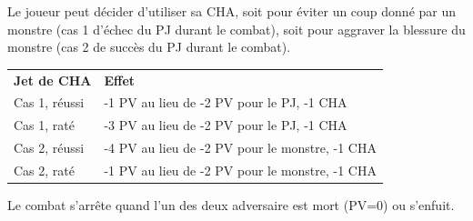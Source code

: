 \begin{frame}[b]
{\myindent Le joueur peut décider d'utiliser sa CHA, soit pour éviter un coup donné par un monstre (cas 1 d'échec du PJ durant le combat), soit pour aggraver la blessure du monstre (cas 2 de succès du PJ durant le combat).

\begin{center}
\begin{tabular}{ll}
\textbf{Jet de CHA} & \textbf{Effet}                                        \\
    Cas 1, réussi          & -1 PV au lieu de -2 PV pour le PJ, -1 CHA      \\
    Cas 1, raté            & -3 PV au lieu de -2 PV pour le PJ, -1 CHA      \\
    Cas 2, réussi          & -4 PV au lieu de -2 PV pour le monstre, -1 CHA \\
    Cas 2, raté            & -1 PV au lieu de -2 PV pour le monstre, -1 CHA \\
\end{tabular}
\end{center}

\myindent Le combat s'arrête quand l'un des deux adversaire est mort (PV=0) ou s'enfuit.

}
\end{frame}

